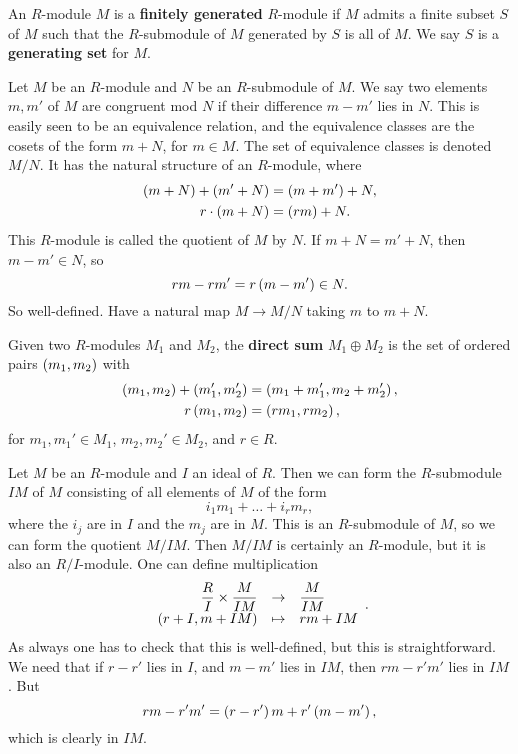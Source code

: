 \begin{definition}
An $ R $-module $ M $ is a \textbf{finitely generated} $ R $-module if $ M $ admits a finite subset $ S $ of $ M $ such that the $ R $-submodule of $ M $ generated by $ S $ is all of $ M $. We say $ S $ is a \textbf{generating set} for $ M $.
\end{definition}

\begin{definition}
Let $ M $ be an $ R $-module and $ N $ be an $ R $-submodule of $ M $. We say two elements $ m, m' $ of $ M $ are congruent mod $ N $ if their difference $ m - m' $ lies in $ N $. This is easily seen to be an equivalence relation, and the equivalence classes are the cosets of the form $ m + N $, for $ m \in M $. The set of equivalence classes is denoted $ M / N $. It has the natural structure of an $ R $-module, where
\begin{align*}
\left( m + N \right) + \left( m' + N \right) & = \left( m + m' \right) + N, \\
r \cdot \left( m + N \right) & = \left( rm \right) + N.
\end{align*}
This $ R $-module is called the quotient of $ M $ by $ N $. If $ m + N = m' + N $, then $ m - m' \in N $, so
$$ rm - rm' = r\left( m - m' \right) \in N. $$
So well-defined. Have a natural map $ M \to M / N $ taking $ m $ to $ m + N $.
\end{definition}

\begin{definition}
Given two $ R $-modules $ M_1 $ and $ M_2 $, the \textbf{direct sum} $ M_1 \oplus M_2 $ is the set of ordered pairs $ \left( m_1, m_2 \right) $ with
\begin{align*}
\left( m_1, m_2 \right) + \left( m_1', m_2' \right) & = \left( m_1 + m_1', m_2 + m_2' \right), \\
r\left( m_1, m_2 \right) & = \left( rm_1, rm_2 \right),
\end{align*}
for $ m_1, m_1' \in M_1 $, $ m_2, m_2' \in M_2 $, and $ r \in R $.
\end{definition}

\pagebreak

\begin{example*}
Let $ M $ be an $ R $-module and $ I $ an ideal of $ R $. Then we can form the $ R $-submodule $ IM $ of $ M $ consisting of all elements of $ M $ of the form
$$ i_1m_1 + \dots + i_rm_r, $$
where the $ i_j $ are in $ I $ and the $ m_j $ are in $ M $. This is an $ R $-submodule of $ M $, so we can form the quotient $ M / IM $. Then $ M / IM $ is certainly an $ R $-module, but it is also an $ R / I $-module. One can define multiplication
$$ \function{\dfrac{R}{I} \times \dfrac{M}{IM}}{\dfrac{M}{IM}}{\rb{r + I, m + IM}}{rm + IM}. $$
As always one has to check that this is well-defined, but this is straightforward. We need that if $ r - r' $ lies in $ I $, and $ m - m' $ lies in $ IM $, then $ rm - r'm' $ lies in $ IM $. But
$$ rm - r'm' = \left( r - r' \right)m + r'\left( m - m' \right), $$
which is clearly in $ IM $.
\end{example*}

